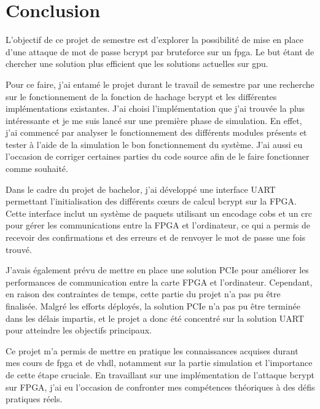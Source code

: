 \chapter*{Conclusion}


L'objectif de ce projet de semestre est d'explorer la possibilité de mise en place d'une attaque de mot de passe bcrypt par bruteforce sur un \gls{fpga}.
Le but étant de chercher une solution plus efficient que les solutions actuelles sur \gls{gpu}. 

Pour ce faire, j'ai entamé le projet durant le travail de semestre par une recherche sur le fonctionnement de la fonction de hachage bcrypt et les différentes implémentations existantes.
J'ai choisi l'implémentation que j'ai trouvée la plus intéressante et je me suis lancé sur une première phase de simulation.
En effet, j'ai commencé par analyser le fonctionnement des différents modules présents et tester à l'aide de la simulation le bon fonctionnement du système.
J'ai aussi eu l'occasion de corriger certaines parties du code source afin de le faire fonctionner comme souhaité. 

Dans le cadre du projet de bachelor, j'ai développé une interface UART permettant l'initialisation des différents cœurs de calcul bcrypt sur la FPGA. 
Cette interface inclut un système de paquets utilisant un encodage \gls{cobs} et un \gls{crc} pour gérer les communications entre la FPGA et l'ordinateur, ce qui a permis de recevoir des confirmations et des erreurs et de renvoyer le mot de passe une fois trouvé.

J'avais également prévu de mettre en place une solution PCIe pour améliorer les performances de communication entre la carte FPGA et l'ordinateur. 
Cependant, en raison des contraintes de temps, cette partie du projet n'a pas pu être finalisée. 
Malgré les efforts déployés, la solution PCIe n'a pas pu être terminée dans les délais impartis, et le projet a donc été concentré sur la solution UART pour atteindre les objectifs principaux.


Ce projet m'a permis de mettre en pratique les connaissances acquises durant mes cours de \gls{fpga} et de \gls{vhdl}, notamment sur la partie simulation et l'importance de cette étape cruciale. 
En travaillant sur une implémentation de l'attaque bcrypt sur FPGA, j'ai eu l'occasion de confronter mes compétences théoriques à des défis pratiques réels.


